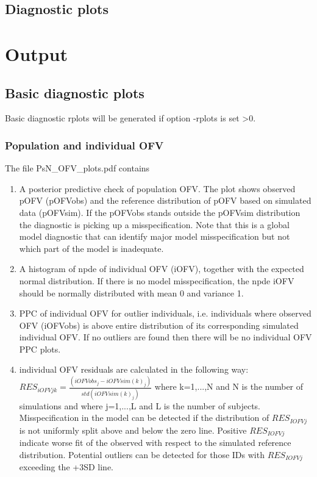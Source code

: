 \subsection{Diagnostic plots}
\newcommand{\rplotsconditions}{
See section Output, subsections Basic and Extended diagnostic plots, for descriptions of the default simeval plots. The default simeval template requires that libraries gridExtra, PEIP and PerformanceAnalytics are installed. If the conditions are not fulfilled then no pdf will be generated, see the .Rout file in the main run directory for error messages.}


\section{Output}
\subsection{Basic diagnostic plots}
Basic diagnostic rplots will be generated if option -rplots is set >0.

\subsubsection{Population and individual OFV}
\noindent The file PsN\_OFV\_plots.pdf contains
\begin{enumerate}
\item A posterior predictive check of population OFV. The plot shows observed pOFV (pOFVobs) and the reference distribution of pOFV based on simulated data (pOFVsim). If the pOFVobs stands outside the pOFVsim distribution the diagnostic is picking up a misspecification. Note that this is a global model diagnostic that can identify major model misspecification but not which part of the model is inadequate.
\item A histogram of npde of individual OFV (iOFV), together with the expected normal distribution. If there is no model misspecification, the npde iOFV should be normally distributed with mean 0 and variance 1.
\item PPC of individual OFV for outlier individuals, i.e. individuals where observed OFV (iOFVobs) is above entire
distribution of its corresponding simulated individual OFV. If no outliers are found then there will be no individual OFV PPC plots.
\item individual OFV residuals are calculated in the following way:
$RES_{iOFVjk}=\frac{(iOFVobs_{j} - iOFVsim(k)_{j})}{std(iOFVsim(k)_{j})}$
where k=1,...,N and N is the number of simulations and where j=1,...,L and L is the number of subjects. Misspecification in the model can be detected if the distribution of $RES_{IOFVj}$ is not uniformly split above and below the zero line. Positive $RES_{IOFVj}$ indicate worse fit of the observed with respect to the simulated reference distribution. Potential outliers can be detected for those IDs with $RES_{IOFVj}$ exceeding the +3SD line. 
\end{enumerate}

